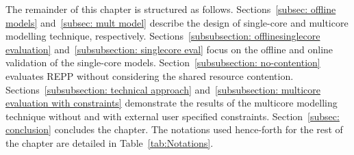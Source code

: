 The remainder of this chapter is structured as follows. Sections~\ref{subsec: offline
models} and~\ref{subsec: mult model} describe the design of single-core and multicore
modelling technique, respectively. Sections~\ref{subsubsection: offlinesinglecore
evaluation} and~\ref{subsubsection: singlecore eval} focus on the offline and online
validation of the single-core models. Section~\ref{subsubsection: no-contention} evaluates
REPP without considering the shared resource contention.  Sections~\ref{subsubsection:
technical approach} and~\ref{subsubsection: multicore evaluation with constraints}
demonstrate the results of the multicore modelling technique without and with external
user specified constraints. Section~\ref{subsec: conclusion} concludes the chapter. The
notations used hence-forth for the rest of the chapter are detailed in
Table~\ref{tab:Notations}.

